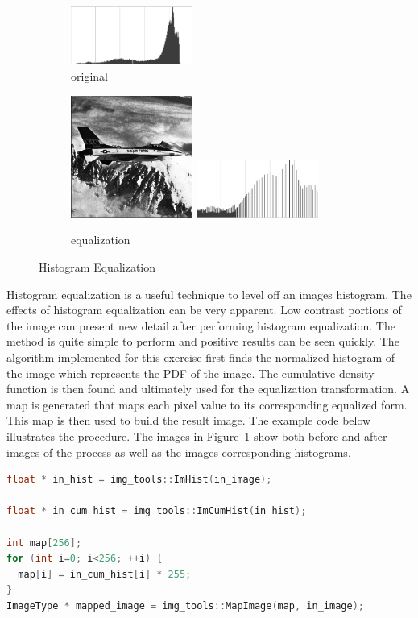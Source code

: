 \documentclass[letterpaper,10pt]{article}
\begin{document}
\begin{figure}[hbtp]
\begin{subfigure}{4cm}
    \includegraphics[width=4cm]{images/f_16_hist.png}
    \caption{original}
  \end{subfigure}
  \begin{subfigure}{4cm}
    \includegraphics[width=4cm]{images/f_16_equalization.png}
    \includegraphics[width=4cm]{images/f_16_equalization_hist.png}
    \caption{equalization}
  \end{subfigure}
  \caption{Histogram Equalization}
  \label{fig:equalization}
\end{figure}
Histogram equalization is a useful technique to level off an images histogram. The effects of histogram equalization can be very apparent. Low contrast portions of the image can present new detail after performing histogram equalization. The method is quite simple to perform and positive results can be seen quickly. The algorithm implemented for this exercise first finds the normalized histogram of the image which represents the PDF of the image. The cumulative density function is then found and ultimately used for the equalization transformation. A map is generated that maps each pixel value to its corresponding equalized form. This map is then used to build the result image. The example code below illustrates the procedure. The images in Figure~\ref{fig:equalization} show both before and after images of the process as well as the images corresponding histograms.

\begin{lstlisting}[frame=single, language=c++]
float * in_hist = img_tools::ImHist(in_image);

float * in_cum_hist = img_tools::ImCumHist(in_hist);

int map[256];
for (int i=0; i<256; ++i) {
  map[i] = in_cum_hist[i] * 255;
}
ImageType * mapped_image = img_tools::MapImage(map, in_image);
\end{lstlisting}
\end{document}
